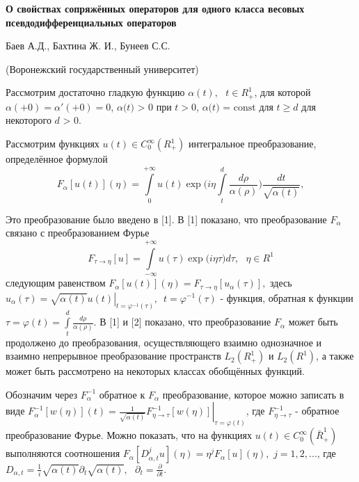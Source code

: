 {
\sloppy
\begin{center}
\textbf{О свойствах сопряжённых операторов для одного класса весовых
псевдодифференциальных операторов }
\end{center}

\begin{center}
Баев А.Д., Бахтина Ж. И., Бунеев С.С.
\end{center}

\begin{center}
(Воронежский государственный университет)
\end{center}





Рассмотрим достаточно гладкую функцию $\alpha (t),\,\,\,\,t \in R_ + ^1 $,
для которой $\alpha ( + 0) = {\alpha }'( + 0) = 0$, $\alpha \mbox{(}t\mbox{)
> 0}$ при $t > 0$, $\alpha \mbox{(}t\mbox{) = const}$ для $t \ge d$ для
некоторого $d\mbox{ > 0}$.

Рассмотрим функциях $u(t) \in C_0^\infty (R_ + ^1 )$ интегральное
преобразование, определённое формулой
\begin{equation}
\label{eq4400}
F_\alpha [u(t)](\eta ) = \int\limits_0^{ + \infty } {u(t)\exp (i\eta }
\int\limits_t^d {\frac{d\rho }{\alpha (\rho )}} )\frac{dt}{\sqrt {\alpha
(t)} },
\end{equation}

Это преобразование было введено в [1]. В [1] показано, что преобразование
$F_\alpha $ связано с преобразованием Фурье
\[
F_{\tau \to \eta } [u] = \int\limits_{ - \infty }^{ + \infty } {u(\tau )\exp
(i\eta } \tau )d\tau ,\,\,\,\,\eta \in R^1
\]
следующим равенством $F_\alpha [u(t)](\eta ) = F_{\tau \to \eta } [u_\alpha
(\tau )],$ здесь $u_\alpha (\tau ) = \left. {\sqrt {\alpha (t)} u(t)}
\right|_{t = \varphi ^{ - 1}(\tau )} ,\,\,\,t = \varphi ^{ - 1}(\tau )$ -
функция, обратная к функции $\tau = \varphi (t) = \int\limits_t^d
{\frac{d\rho }{\alpha (\rho )}} .$ В [1] и [2] показано, что преобразование
$F_\alpha $ может быть продолжено до преобразования, осуществляющего взаимно
однозначное и взаимно непрерывное преобразование пространств $L_2 (R_ + ^1
)$ и $L_2 (R^1 )$, а также может быть рассмотрено на некоторых классах
обобщённых функций.

Обозначим через $F_\alpha ^{ - 1} $ обратное к $F_\alpha $ преобразование,
которое можно записать в виде $F_\alpha ^{ - 1} [w(\eta )](t) = \left.
{\frac{1}{\sqrt {\alpha (t)} }F_{\eta \to \tau }^{ - 1} [w(\eta )]}
\right|_{\tau = \varphi (t)} $, где $F_{\eta \to \tau }^{ - 1} $ - обратное
преобразование Фурье. Можно показать, что на функциях $u(t) \in C_0^\infty
(\bar {R}_ + ^1 )$ выполняются соотношения $F_\alpha [D_{\alpha ,t}^j
u](\eta ) = \eta ^jF_\alpha [u](\eta ),\,\,j = 1,2,...$, где $D_{\alpha ,t}
= \frac{1}{i}\sqrt {\alpha (t)} \partial _t \sqrt {\alpha (t)}
,\,\,\,\,\partial _t = \frac{\partial }{\partial t}.$

}
